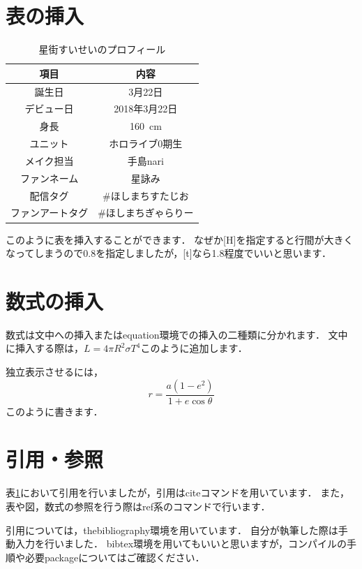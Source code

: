 \documentclass[a4paper, 11pt]{report}
\newcommand{\tableref}[1]{表\ref{#1}}
\begin{document}
\section{表の挿入}
\begin{table}[H]
    \centering
    \renewcommand{\arraystretch}{.8}
    \setlength{\tabcolsep}{12pt}
    \caption{星街すいせいのプロフィール\cite{11}}
    \begin{tabular}{c|c}
        \toprule
        \textbf{項目} & \textbf{内容} \\ 
        \midrule
        誕生日 & 3月22日 \\ 
        デビュー日 & 2018年3月22日 \\ 
        身長 & \SI{160}{cm} \\ 
        ユニット & ホロライブ0期生 \\ 
        メイク担当 & 手島nari \\ 
        ファンネーム & 星詠み \\ 
        配信タグ & \#ほしまちすたじお \\ 
        ファンアートタグ & \#ほしまちぎゃらりー \\ 
        \bottomrule
    \end{tabular}
    \label{tab_suisei_profile}
\end{table}
このように表を挿入することができます．
なぜか[H]を指定すると行間が大きくなってしまうので0.8を指定しましたが，[t]なら1.8程度でいいと思います．

\section{数式の挿入}
数式は文中への挿入またはequation環境での挿入の二種類に分かれます．
文中に挿入する際は，\(L = 4\pi R^2 \sigma T^4\)このように追加します．

独立表示させるには，
\begin{equation}
    r = \frac{a(1 - e^2)}{1 + e \cos\theta}
\end{equation}
このように書きます．

\section{引用・参照}
\tableref{tab_suisei_profile}において引用を行いましたが，引用はciteコマンドを用いています．
また，表や図，数式の参照を行う際はref系のコマンドで行います．

引用については，thebibliography環境を用いています．
自分が執筆した際は手動入力を行いました．
bibtex環境を用いてもいいと思いますが，コンパイルの手順や必要packageについてはご確認ください．
\end{document}
